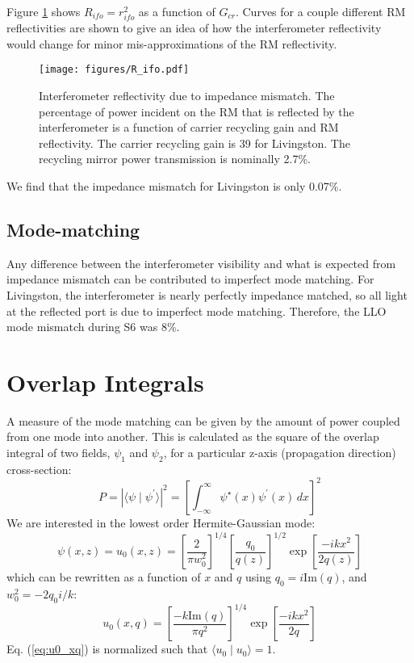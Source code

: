 Figure \ref{fig:reflectivity} shows $R_{ifo} = r_{ifo}^2$ as a
function of $G_{cr}$. Curves for a couple different RM reflectivities
are shown to give an idea of how the interferometer reflectivity would
change for minor mis-approximations of the RM reflectivity. 
\begin{figure}
\begin{centering}
\texttt{[image: figures/R\_ifo.pdf]}
\caption[Interferometer reflectivity due to impedance
mismatch]{Interferometer reflectivity due to impedance mismatch. The
  percentage of power incident on the RM that is reflected by the
  interferometer is a function of carrier recycling gain and RM
  reflectivity. The carrier recycling gain is 39 for Livingston. The
  recycling mirror power transmission is nominally 2.7\%.}
\label{fig:reflectivity}
\end{centering}
\end{figure}
We find that the impedance mismatch for Livingston is only 0.07\%.



\subsection{Mode-matching}
Any difference between the interferometer visibility and what is
expected from impedance mismatch can be contributed to imperfect mode
matching. For Livingston, the interferometer is nearly perfectly
impedance matched, so all light at the reflected port is due to
imperfect mode matching. Therefore, the LLO mode mismatch during S6
was 8\%.





\section{Overlap Integrals}
A measure of the mode matching can be given by the amount of power
coupled from one mode into another. This is calculated as the square
of the overlap integral of two fields, $\psi_1$ and $\psi_2$, for a
particular z-axis (propagation direction) cross-section:
\begin{equation}
P = \left| \langle \psi \mid \psi^{\prime} \rangle \right|^2 = \left[\int_{-\infty}^\infty \psi^\star(x) \psi^{\prime}(x) \, dx \right]^2
\end{equation}
We are interested in the lowest order Hermite-Gaussian mode:
\begin{equation}
\psi(x,z) = u_0(x,z) = \left[ \frac{2}{\pi w_0^2} \right]^{1/4} \left[
  \frac{q_0}{q(z)} \right]^{1/2} \exp{\left[ \frac{-i k x^2}{2 q(z)}
  \right] }
\end{equation}
which can be rewritten as a function of $x$ and $q$ using
$q_0=i \mbox{Im}(q)$, and $w_0^2 = -2 q_0 i/k$:
\begin{equation}
u_0(x,q) = \left[ \frac{-k \mbox{Im}(q)}{\pi q^2} \right]^{1/4} \exp{\left[ \frac{-i k x^2}{2 q}
  \right] }
\label{eq:u0_xq}
\end{equation}
Eq. (\ref{eq:u0_xq}) is normalized such that $\langle u_0 \mid u_0
\rangle = 1$.

